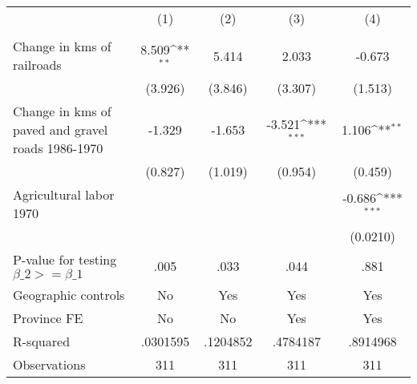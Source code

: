 {
\def\sym#1{\ifmmode^{#1}\else\(^{#1}\)\fi}
\begin{tabular}{l*{4}{c}}
\hline\hline
                &\multicolumn{1}{c}{(1)}&\multicolumn{1}{c}{(2)}&\multicolumn{1}{c}{(3)}&\multicolumn{1}{c}{(4)}\\
                &\multicolumn{1}{c}{}&\multicolumn{1}{c}{}&\multicolumn{1}{c}{}&\multicolumn{1}{c}{}\\
\hline
Change in kms of railroads&    8.509\sym{**} &    5.414         &    2.033         &   -0.673         \\
                &  (3.926)         &  (3.846)         &  (3.307)         &  (1.513)         \\
[1em]
Change in kms of paved and gravel roads 1986-1970&   -1.329         &   -1.653         &   -3.521\sym{***}&    1.106\sym{**} \\
                &  (0.827)         &  (1.019)         &  (0.954)         &  (0.459)         \\
[1em]
Agricultural labor 1970&                  &                  &                  &   -0.686\sym{***}\\
                &                  &                  &                  & (0.0210)         \\
\hline
P-value for testing $\beta\_{2} >= \beta\_{1}$&     .005         &     .033         &     .044         &     .881         \\
Geographic controls&       No         &      Yes         &      Yes         &      Yes         \\
Province FE     &       No         &       No         &      Yes         &      Yes         \\
R-squared       & .0301595         & .1204852         & .4784187         & .8914968         \\
Observations    &      311         &      311         &      311         &      311         \\
\hline\hline
\end{tabular}
}
